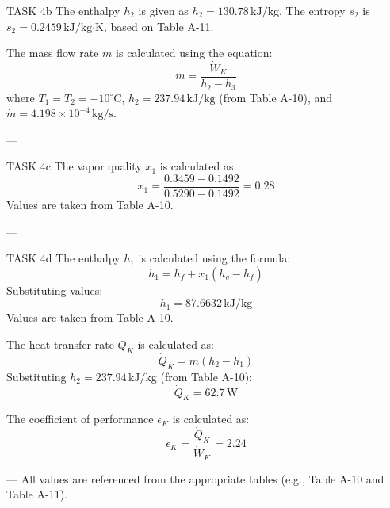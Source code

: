 TASK 4b  
The enthalpy \( h_2 \) is given as \( h_2 = 130.78 \, \text{kJ/kg} \). The entropy \( s_2 \) is \( s_2 = 0.2459 \, \text{kJ/kg·K} \), based on Table A-11.  

The mass flow rate \( \dot{m} \) is calculated using the equation:  
\[
\dot{m} = \frac{\dot{W}_K}{h_2 - h_3}
\]  
where \( T_1 = T_2 = -10^\circ\text{C} \), \( h_2 = 237.94 \, \text{kJ/kg} \) (from Table A-10), and \( \dot{m} = 4.198 \times 10^{-4} \, \text{kg/s} \).  

---

TASK 4c  
The vapor quality \( x_1 \) is calculated as:  
\[
x_1 = \frac{0.3459 - 0.1492}{0.5290 - 0.1492} = 0.28
\]  
Values are taken from Table A-10.  

---

TASK 4d  
The enthalpy \( h_1 \) is calculated using the formula:  
\[
h_1 = h_f + x_1 (h_g - h_f)
\]  
Substituting values:  
\[
h_1 = 87.6632 \, \text{kJ/kg}
\]  
Values are taken from Table A-10.  

The heat transfer rate \( \dot{Q}_K \) is calculated as:  
\[
\dot{Q}_K = \dot{m} (h_2 - h_1)
\]  
Substituting \( h_2 = 237.94 \, \text{kJ/kg} \) (from Table A-10):  
\[
\dot{Q}_K = 62.7 \, \text{W}
\]  

The coefficient of performance \( \epsilon_K \) is calculated as:  
\[
\epsilon_K = \frac{\dot{Q}_K}{\dot{W}_K} = 2.24
\]  

---  
All values are referenced from the appropriate tables (e.g., Table A-10 and Table A-11).